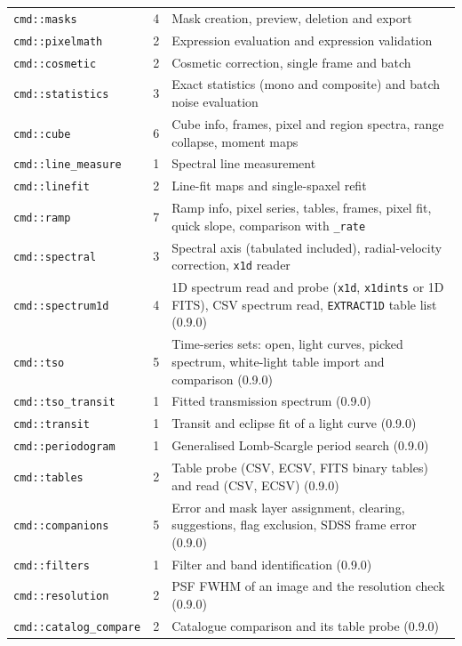 \documentclass[11pt,a4paper]{article}
\newcommand{\code}[1]{\texttt{\small #1}}
\begin{document}
\begin{longtable}{lr>{\raggedright\arraybackslash}p{9.4cm}}
    \code{cmd::masks} & 4 & Mask creation, preview, deletion and export \\
    \code{cmd::pixelmath} & 2 & Expression evaluation and expression validation \\
    \code{cmd::cosmetic} & 2 & Cosmetic correction, single frame and batch \\
    \code{cmd::statistics} & 3 & Exact statistics (mono and composite) and batch noise evaluation \\
    \code{cmd::cube} & 6 & Cube info, frames, pixel and region spectra, range collapse, moment maps \\
    \code{cmd::line\_measure} & 1 & Spectral line measurement \\
    \code{cmd::linefit} & 2 & Line-fit maps and single-spaxel refit \\
    \code{cmd::ramp} & 7 & Ramp info, pixel series, tables, frames, pixel fit, quick slope, comparison with \code{\_rate} \\
    \code{cmd::spectral} & 3 & Spectral axis (tabulated included), radial-velocity correction, \code{x1d} reader \\
    \code{cmd::spectrum1d} & 4 & 1D spectrum read and probe (\code{x1d}, \code{x1dints} or 1D FITS), CSV spectrum read, \code{EXTRACT1D} table list (0.9.0) \\
    \code{cmd::tso} & 5 & Time-series sets: open, light curves, picked spectrum, white-light table import and comparison (0.9.0) \\
    \code{cmd::tso\_transit} & 1 & Fitted transmission spectrum (0.9.0) \\
    \code{cmd::transit} & 1 & Transit and eclipse fit of a light curve (0.9.0) \\
    \code{cmd::periodogram} & 1 & Generalised Lomb-Scargle period search (0.9.0) \\
    \code{cmd::tables} & 2 & Table probe (CSV, ECSV, FITS binary tables) and read (CSV, ECSV) (0.9.0) \\
    \code{cmd::companions} & 5 & Error and mask layer assignment, clearing, suggestions, flag exclusion, SDSS frame error (0.9.0) \\
    \code{cmd::filters} & 1 & Filter and band identification (0.9.0) \\
    \code{cmd::resolution} & 2 & PSF FWHM of an image and the resolution check (0.9.0) \\
    \code{cmd::catalog\_compare} & 2 & Catalogue comparison and its table probe (0.9.0) \\

\end{longtable}
\end{document}
